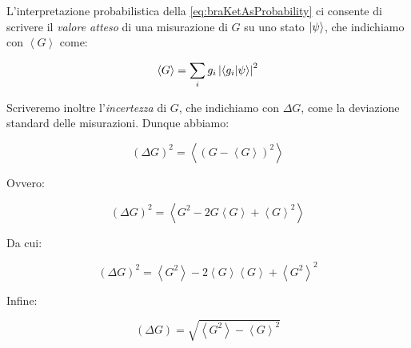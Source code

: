 L'interpretazione probabilistica della \eqref{eq:braKetAsProbability} ci consente di scrivere il \textit{valore atteso} di una misurazione di $G$ su uno stato $\ket{\psi}$, che indichiamo con $\left \langle G \right \rangle$ come:

	\begin{equation}
		\left \langle G \right \rangle = \sum_i g_i \left | \braket{g_i}{\psi} \right |^2
	\end{equation}

Scriveremo inoltre l'\textit{incertezza} di $G$, che indichiamo con $\Delta G$, come la deviazione standard delle misurazioni. Dunque abbiamo:

	\begin{equation}
		(\Delta G)^2 = \left \langle (G - \left \langle G \right \rangle) ^2 \right \rangle
	\end{equation}

Ovvero:

	\begin{equation}
		(\Delta G)^2 = \left \langle G^2 - 2 G \left \langle G \right \rangle + \left \langle G \right \rangle ^2 \right \rangle
	\end{equation}

Da cui:

	\begin{equation}
		(\Delta G)^2 = \left \langle G^2 \right \rangle - 2 \left \langle G \right \rangle \left \langle G \right \rangle + \left \langle G^2 \right \rangle^2
	\end{equation}

Infine:

	\begin{equation}
		(\Delta G) = \sqrt{ \left \langle G^2 \right \rangle - \left \langle G \right \rangle ^ 2 }
	\end{equation}
